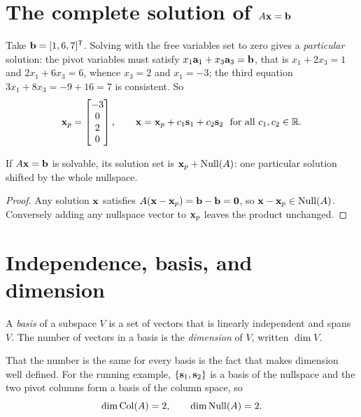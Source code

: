 \section{The complete solution of \texorpdfstring{\(A\mathbf{x}=\mathbf{b}\)}{Ax=b}}

Take \(\mathbf{b}=[1,6,7]^{\mathsf{T}}\). Solving with the free variables set to zero gives a
\emph{particular} solution: the pivot variables must satisfy
\(x_1\mathbf{a}_1+x_3\mathbf{a}_3=\mathbf{b}\), that is \(x_1+2x_3=1\) and
\(2x_1+6x_3=6\), whence \(x_3=2\) and \(x_1=-3\); the third equation
\(3x_1+8x_3=-9+16=7\) is consistent. So
\[
	\mathbf{x}_p=\begin{bmatrix}-3\\0\\2\\0\end{bmatrix},
	\qquad
	\mathbf{x}=\mathbf{x}_p+c_1\mathbf{s}_1+c_2\mathbf{s}_2\ \ \text{for all }c_1,c_2\in\mathbb{R}.
\]

\begin{proposition}
If \(A\mathbf{x}=\mathbf{b}\) is solvable, its solution set is
\(\mathbf{x}_p+\operatorname{Null}(A)\): one particular solution shifted by the whole nullspace.
\end{proposition}

\begin{proof}
Any solution \(\mathbf{x}\) satisfies \(A(\mathbf{x}-\mathbf{x}_p)=\mathbf{b}-\mathbf{b}
=\mathbf{0}\), so \(\mathbf{x}-\mathbf{x}_p\in\operatorname{Null}(A)\). Conversely adding any
nullspace vector to \(\mathbf{x}_p\) leaves the product unchanged.
\end{proof}


\section{Independence, basis, and dimension}

\begin{definition}
A \emph{basis} of a subspace \(V\) is a set of vectors that is linearly
independent and spans \(V\). The number of vectors in a basis is the
\emph{dimension} of \(V\), written \(\dim V\).
\end{definition}

That the number is the same for every basis is the fact that makes dimension
well defined. For the running example, \(\{\mathbf{s}_1,\mathbf{s}_2\}\) is a basis
of the nullspace and the two pivot columns form a basis of the column space, so
\[
	\dim\operatorname{Col}(A)=2,
	\qquad
	\dim\operatorname{Null}(A)=2 .
\]

